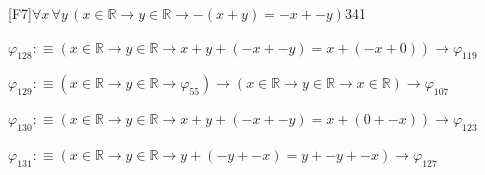 \begin{fullproof}{[F7]}{$\forall x\,\forall y\,(x \in \mathbb{R} \to y \in \mathbb{R} \to -(x + y) = -x + -y)$}{341}
\begin{abbrevlist}
\item $\varphi_{128} :\equiv (x \in \mathbb{R} \to y \in \mathbb{R} \to x + y + (-x + -y) = x + (-x + 0)) \to \varphi_{119}$
\item $\varphi_{129} :\equiv (x \in \mathbb{R} \to y \in \mathbb{R} \to \varphi_{55}) \to (x \in \mathbb{R} \to y \in \mathbb{R} \to x \in \mathbb{R}) \to \varphi_{107}$
\item $\varphi_{130} :\equiv (x \in \mathbb{R} \to y \in \mathbb{R} \to x + y + (-x + -y) = x + (0 + -x)) \to \varphi_{123}$
\item $\varphi_{131} :\equiv (x \in \mathbb{R} \to y \in \mathbb{R} \to y + (-y + -x) = y + -y + -x) \to \varphi_{127}$
\end{abbrevlist}
\end{fullproof}
